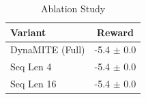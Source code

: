\begin{table}[h]
\centering
\caption{Ablation Study}
\begin{tabular}{lc}
\toprule
Variant & Reward \\
\midrule
DynaMITE (Full) & -5.4 $\pm$ 0.0 \\
Seq Len 4 & -5.4 $\pm$ 0.0 \\
Seq Len 16 & -5.4 $\pm$ 0.0 \\
\bottomrule
\end{tabular}
\end{table}